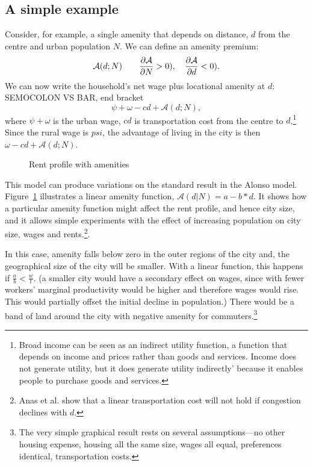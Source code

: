  \subsection{A simple example}
Consider, for example, a single amenity that depends on distance, $d$ from the centre and urban population $N$.
We can define an \gls{amenity premium}: \[\mathcal{A}(d; N) \qquad \frac{\partial \mathcal{A}}{\partial N}> 0), \quad\frac{\partial \mathcal{A}}{\partial d}< 0).\] 
We can now write the household's net wage plus locational amenity at $d$:
{\color{red} SEMOCOLON VS BAR, end bracket}
\begin{equation} \psi+ \omega-cd + \mathcal{A}(d; N), 
\label{eqn-u}
\end{equation}
where $\psi+ \omega$  is the urban wage, $cd$ is transportation cost from the centre to $d$.\footnote{Broad income can be seen as an indirect utility function, a function that depends on income and prices rather than goods and services.   Income does not generate utility, but it does generate utility indirectly' because it enables people to purchase goods and services.}  Since the rural wage is $psi$, the advantage of living in the city is then $\omega-cd + \mathcal{A}(d; N) $.



\begin{figure}[t!b]
\begin{center}

\end{center}
\caption{Rent profile with amenities}
\label{fig-amenity}
\end{figure}

 

This model can produce variations on the standard result in the Alonso model. Figure~\ref{fig-amenity} illustrates a linear amenity function, $\mathcal{A}(d|N)= a-b*d$.  It shows how a particular amenity function might affect the rent profile, and hence city size, and it allows simple experiments with the effect of increasing population on city size, wages and rents.\footnote{Anas et al. \cite{anasUrbanSpatialStructure1998} show that a linear transportation cost will not hold if congestion declines with $d$.}. 

In this case, amenity falls below zero in the outer regions of the city and, the geographical size of the city will be smaller. With a linear function, this happens if $\frac{a}{b} < \frac{w}{t}$. (a smaller city would have a secondary effect on wages, since with fewer workers' marginal productivity would be higher and therefore wages would rise. This would partially offset the initial decline in population.)
There would be a band of land around the city with negative amenity for commuters.\footnote{The very simple graphical result rests on several assumptions---no other housing expense, housing all the same size, wages all equal, preferences identical, transportation costs.}


